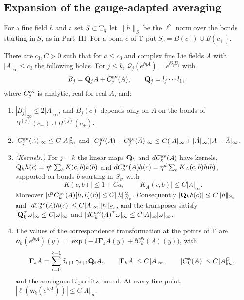 \subsection{Expansion of the gauge-adapted averaging}\label{ss:22.5}

For a fine field $h$ and a set $S\subset\mathbb T_\eta$ let $\|h\|_S$ be the $\ell^2$ norm over the bonds starting in $S$, as in Part~III. For a bond $c$ of $\mathbb T$ put $S_c=B(c_-)\cup B(c_+)$.

\begin{proposition}\label{prop:Q-expansion}
There are $c_3,C>0$ such that for $a\le c_3$ and complex fine Lie fields $A$ with $|A|_\infty\le c_3$ the following holds. For $j\le k$, $\mathcal Q_j(e^{\ii\eta A})=e^{\ii\delta_jB_j}$ with
\[
B_j=\mathbf Q_jA+C^{\rm av}_j(A),\qquad \mathbf Q_j=l_j\cdots l_1,
\]
where $C^{\rm av}_j$ is analytic, real for real $A$, and:
\begin{enumerate}[label=(\alph*)]
\item $|B_j|_\infty\le2|A|_\infty$, and $B_j(c)$ depends only on $A$ on the bonds of $B^{(j)}(c_-)\cup B^{(j)}(c_+)$.
\item $|C^{\rm av}_j(A)|_\infty\le C|A|_\infty^2$ and $|C^{\rm av}_j(A)-C^{\rm av}_j(\tilde A)|_\infty\le C(|A|_\infty+|\tilde A|_\infty)|A-\tilde A|_\infty$.
\item \emph{(Kernels.)} For $j=k$ the linear maps $\mathbf Q_k$ and $dC^{\rm av}_k(A)$ have kernels, $\mathbf Q_kh(c)=\eta^d\sum_bK(c,b)h(b)$ and $dC^{\rm av}_k(A)h(c)=\eta^d\sum_bK_A(c,b)h(b)$, supported on bonds $b$ starting in $S_c$, with
\[
|K(c,b)|\le1+Ca,\qquad|K_A(c,b)|\le C|A|_\infty .
\]
Moreover $|d^2C^{\rm av}_k(A)[h,h](c)|\le C\|h\|^2_{S_c}$. Consequently $|\mathbf Q_kh(c)|\le C\|h\|_{S_c}$ and $|dC^{\rm av}_k(A)h(c)|\le C|A|_\infty\|h\|_{S_c}$, and the transposes satisfy $|\mathbf Q_k^T\omega|_\infty\le C|\omega|_\infty$ and $|dC^{\rm av}_k(A)^T\omega|_\infty\le C|A|_\infty|\omega|_\infty$.
\item The values of the correspondence transformation at the points of $\mathbb T$ are $\mathsf w_k(e^{\ii\eta A})(y)=\exp\big(-\ii\,\boldsymbol\Gamma_kA(y)+\ii C^{\mathsf w}_k(A)(y)\big)$, with
\[
\boldsymbol\Gamma_kA=\sum_{i=0}^{k-1}\delta_{i+1}\,\gamma_{i+1}\mathbf Q_iA,\qquad|\boldsymbol\Gamma_kA|\le C|A|_\infty,\qquad|C^{\mathsf w}_k(A)|\le C|A|_\infty^2,
\]
and the analogous Lipschitz bound. At every fine point, $|\ell(\mathsf w_k(e^{\ii\eta A}))|\le C|A|_\infty$.
\end{enumerate}
\end{proposition}

